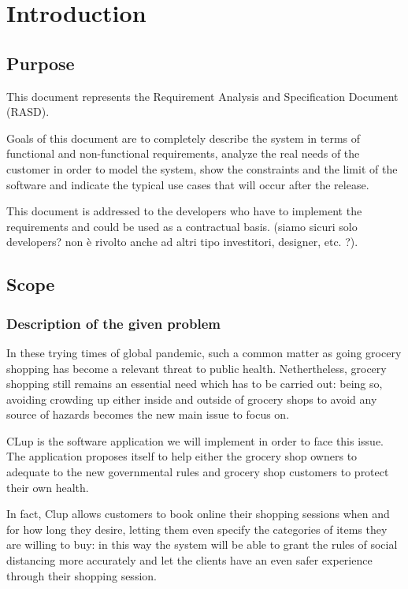 \section{Introduction}
\label{sect:introduction}

\subsection{Purpose}
\label{subsect:purpose}

This document represents the Requirement Analysis and Specification Document (RASD). 

Goals of this document are to completely describe the system in terms of functional and non-functional requirements, analyze the real needs of the customer in order to model the system, show the constraints and the limit of the software and indicate the typical use cases that will occur after the release. 

This document is addressed to the developers who have to implement the requirements and could be used as a contractual basis. (siamo sicuri solo developers? non è rivolto anche ad altri tipo investitori, designer, etc. ?).

\subsection{Scope}
\label{subsect:scope}

\subsubsection{Description of the given problem}
\label{subsect:descriptionofthegivenproblem}

In these trying times of global pandemic, such a common matter as going grocery shopping has become a relevant threat to public health. 
Nethertheless, grocery shopping still remains an essential need which has to be carried out: being so, avoiding crowding up either inside and outside of grocery shops to avoid any source of hazards becomes the new main issue to focus on.

CLup is the software application we will implement in order to face this issue. The application proposes itself to help either the grocery shop owners to adequate to the new governmental rules and grocery shop customers to protect their own health.

In fact, Clup allows customers to book online their shopping sessions when and for how long they desire, letting them even specify the categories of items they are willing to buy: in this way the system will be able to grant the rules of social distancing more accurately and let the clients have an even safer experience through their shopping session.


